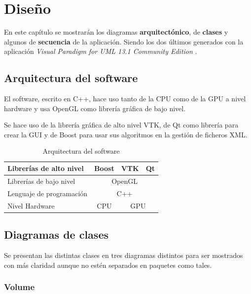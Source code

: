 \chapter{Diseño}

En este capítulo se mostrarán los diagramas \textbf{arquitectónico}, de \textbf{clases} y algunos de \textbf{secuencia} de la aplicación. Siendo los dos últimos generados con la aplicación \textit{Visual Paradigm for UML 13.1 Community Edition} \cite{vpp}.

\section{Arquitectura del software}

El software, escrito en C++, hace uso tanto de la CPU como de la GPU a nivel hardware y usa OpenGL como librería gráfica de bajo nivel.

Se hace uso de la librería gráfica de alto nivel VTK, de Qt como librería para crear la GUI y de Boost para usar sus algoritmos en la gestión de ficheros XML.

\begin{table}[H]
	\begin{center}
		\begin{tabular}{|l|c|c|c|c|}
			\hline
			Librerías de alto nivel  & \multicolumn{2}{c|}{Boost} & VTK        & Qt        \\ \hline
			Librerías de bajo nivel  & \multicolumn{4}{c|}{OpenGL}                         \\ \hline
			Lenguaje de programación & \multicolumn{4}{c|}{C++}                            \\ \hline
			Nivel Hardware           & \multicolumn{2}{c|}{CPU} & \multicolumn{2}{c|}{GPU} \\ \hline
		\end{tabular}
	\end{center}
	\caption{Arquitectura del software}
	\label{tab:diagrama_arquitectonico}
\end{table}

\section{Diagramas de clases}

Se presentan las distintas clases en tres diagramas distintos para ser mostrados con más claridad aunque no estén separados en paquetes como tales.

\subsection{Volume}

